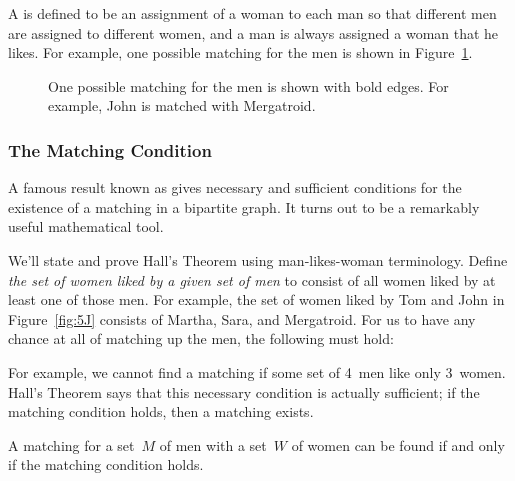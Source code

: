 A  is defined to be an assignment of a woman to each
man so that different men are assigned to different women, and a man
is always assigned a woman that he likes.  For example, one possible
matching for the men is shown in Figure~\ref{fig:5K}.

\begin{figure}



\caption{One possible matching for the men is shown with bold edges.
  For example, John is matched with Mergatroid.}

\label{fig:5K}

\end{figure}

\subsubsection{The Matching Condition}

A famous result known as  gives necessary
and sufficient conditions for the existence of a matching in a
bipartite graph.  It turns out to be a remarkably useful mathematical
tool.

We'll state and prove Hall's Theorem using man-likes-woman
terminology.  Define \emph{the set of women liked by a given set of
  men} to consist of all women liked by at least one of those men.
For example, the set of women liked by Tom and John in
Figure~\ref{fig:5J} consists of Martha, Sara, and Mergatroid.  For us
to have any chance at all of matching up the men, the following
 must hold:

\medskip

\noindent{}

\medskip

For example, we cannot find a matching if some set of 4~men like only
3~women.  Hall's Theorem says that this necessary condition is
actually sufficient; if the matching condition holds, then a matching
exists.

\begin{theorem}\label{thm:matching}
  A matching for a set~$M$ of men with a set~$W$ of women can be found if
  and only if the matching condition holds.
\end{theorem}

